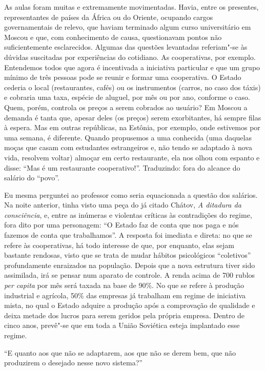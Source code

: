 As aulas foram muitas e extremamente movimentadas. Havia, entre os presentes, representantes de países da África ou do Oriente, ocupando cargos governamentais de relevo, que haviam terminado algum curso universitário em Moscou e que, com conhecimento de causa, questionavam pontos não suficientemente esclarecidos. Algumas das questões levantadas referiam"-se às dúvidas suscitadas por experiências do cotidiano. As cooperativas, por exemplo. Entendemos todos que agora é incentivada a iniciativa particular e que um grupo mínimo de três pessoas pode se reunir e formar uma cooperativa. O Estado cederia o local (restaurantes, cafés) ou os instrumentos (carros, no caso dos táxis) e cobraria uma taxa, espécie de aluguel, por mês ou por ano, conforme o caso. Quem, porém, controla os preços a serem cobrados ao usuário? Em Moscou a demanda é tanta que, apesar deles (os preços) serem exorbitantes, há sempre filas à espera. Mas em outras repúblicas, na Estônia, por exemplo, onde estivemos por uma semana, é diferente. Quando propusemos a uma conhecida (uma daquelas moças que casam com estudantes estrangeiros e, não tendo se adaptado à nova vida, resolvem voltar) almoçar em certo restaurante, ela nos olhou com espanto e disse: ``Mas é um restaurante cooperativo!''. Traduzindo: fora do alcance do salário do ``povo''.

Eu mesma perguntei ao professor como seria equacionada a questão dos salários. Na noite anterior, tinha visto uma peça do já citado Chátov, \emph{A ditadura da consciência}, e, entre as inúmeras e violentas críticas às contradições do regime, fora dito por uma personagem: ``O Estado faz de conta que nos paga e nós fazemos de conta que trabalhamos''. A resposta foi imediata e direta: no que se refere às cooperativas, há todo interesse de que, por enquanto, elas sejam bastante rendosas, visto que se trata de mudar hábitos psicológicos ``coletivos'' profundamente enraizados na população. Depois que a nova estrutura tiver sido assimilada, irá se pensar num aparato de controle. A renda acima de 700 rublos \emph{per capita} por mês será taxada na base de 90\%. No que se refere à produção industrial e agrícola, 50\% das empresas já trabalham em regime de iniciativa mista, no qual o Estado
adquire a produção após a comprovação de qualidade e deixa metade dos lucros para serem geridos pela própria empresa. Dentro de cinco anos, prevê"-se que em toda a União Soviética esteja implantado esse regime.

``E quanto aos que não se adaptarem, aos que não se derem bem, que não produzirem o desejado nesse novo sistema?''

